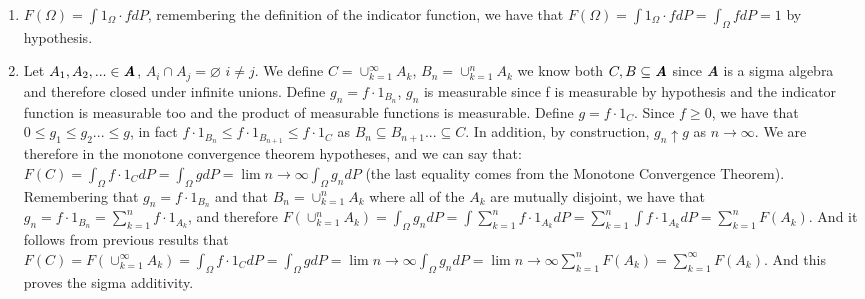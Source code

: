 \documentclass[12pt,mythesisstyle]{report}
\begin{document}
\begin{enumerate}
  \item $F(\Omega)=\int 1_\Omega\cdot fdP$, remembering the definition of the indicator function, we have that $F(\Omega)=\int 1_\Omega\cdot fdP=\int_\Omega fdP=1$ by hypothesis.
  \item Let $A_1, A_2,...\in\textbf{\textit{A}}$, $A_i\cap A_j=\varnothing$ $i\neq j$. We define $C=\cup_{k=1}^{\infty}A_k$, $B_n=\cup_{k=1}^{n}A_k$ we know both $C,B\subseteq\textbf{\textit{A}}$ since \textbf{\textit{A}} is a sigma algebra and therefore closed under infinite unions. Define $g_n=f\cdot 1_{B_n}$, $g_n$ is measurable since f is measurable by hypothesis and the indicator function is measurable too and the product of measurable functions is measurable. Define $g=f\cdot 1_{C}$. Since $f\geq 0$, we have that $0 \leq g_1\leq g_2...\leq g$, in fact $f\cdot 1_{B_n}\leq f\cdot 1_{B_{n+1}}\leq f\cdot 1_C$ as $B_n\subseteq B_{n+1}...\subseteq C$. In addition, by construction, $g_n\uparrow g$ as $n\rightarrow \infty$. We are therefore in the monotone convergence theorem hypotheses, and we can say that: $F(C)=\int_{\Omega} f\cdot 1_{C}dP=\int_{\Omega} gdP=\lim{n \rightarrow \infty}\int_{\Omega} g_n dP$ (the last equality comes from the Monotone Convergence Theorem). Remembering that $g_n=f\cdot 1_{B_n}$ and that $B_n=\cup_{k=1}^{n}A_k$ where all of the $A_k$ are mutually disjoint, we have that $g_n=f\cdot 1_{B_n}=\sum_{k=1}^n f\cdot 1_{A_k}$, and therefore $F(\cup_{k=1}^{n}A_k)=\int_{\Omega} g_n dP=\int\sum_{k=1}^n f\cdot 1_{A_k}dP=\sum_{k=1}^n\int f\cdot 1_{A_k}dP=\sum_{k=1}^n F(A_k)$. And it follows from previous results that $F(C)=F(\cup_{k=1}^{\infty}A_k)=\int_{\Omega} f\cdot 1_{C}dP=\int_{\Omega} gdP=\lim{n \rightarrow \infty}\int_{\Omega} g_n dP=\lim{n \rightarrow \infty} \sum_{k=1}^n F(A_k)=\sum_{k=1}^{\infty} F(A_k)$. And this proves the sigma additivity.
\end{enumerate}
\end{document}
